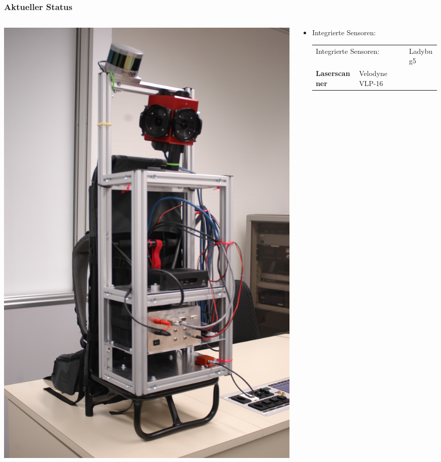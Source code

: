 \documentclass[aspectratio=169]{beamer}
\begin{document}
\begin{frame}
\frametitle{Aktueller Status}
  \begin{columns}[onlytextwidth]
    \begin{column}{0.33\textwidth}
      \includegraphics[height=0.7\textheight]{./Abbildungen/cappro_3.JPG}
    \end{column}
    \begin{column}{0.66\textwidth}
      \begin{itemize}
       \item Integrierte Sensoren:
	 \begin{tabular}{ll}
	\multicolumn{2}{l}{Integrierte Sensoren:}
	\textbf{Kamera} & Ladybug5\\
	\textbf{Laserscanner} & Velodyne VLP-16\\

\end{tabular}
\end{itemize}
\end{column}
\end{columns}
\end{frame}
\end{document}

